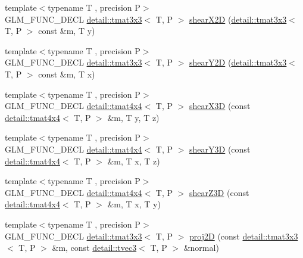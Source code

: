 \begin{DoxyCompactItemize}
\item 
{\footnotesize template$<$typename T , precision P$>$ }\\G\+L\+M\+\_\+\+F\+U\+N\+C\+\_\+\+D\+E\+CL \hyperlink{structglm_1_1detail_1_1tmat3x3}{detail\+::tmat3x3}$<$ T, P $>$ \hyperlink{group__gtx__transform2_gaa5a2d9216b3298b03252e549de6fd98a}{shear\+X2D} (\hyperlink{structglm_1_1detail_1_1tmat3x3}{detail\+::tmat3x3}$<$ T, P $>$ const \&m, T y)
\item 
{\footnotesize template$<$typename T , precision P$>$ }\\G\+L\+M\+\_\+\+F\+U\+N\+C\+\_\+\+D\+E\+CL \hyperlink{structglm_1_1detail_1_1tmat3x3}{detail\+::tmat3x3}$<$ T, P $>$ \hyperlink{group__gtx__transform2_ga1f5e68ada7a56cdf86c0c56d0b0a1832}{shear\+Y2D} (\hyperlink{structglm_1_1detail_1_1tmat3x3}{detail\+::tmat3x3}$<$ T, P $>$ const \&m, T x)
\item 
{\footnotesize template$<$typename T , precision P$>$ }\\G\+L\+M\+\_\+\+F\+U\+N\+C\+\_\+\+D\+E\+CL \hyperlink{structglm_1_1detail_1_1tmat4x4}{detail\+::tmat4x4}$<$ T, P $>$ \hyperlink{group__gtx__transform2_gaae5bbb490a3d798b083cbec0e0c2e94c}{shear\+X3D} (const \hyperlink{structglm_1_1detail_1_1tmat4x4}{detail\+::tmat4x4}$<$ T, P $>$ \&m, T y, T z)
\item 
{\footnotesize template$<$typename T , precision P$>$ }\\G\+L\+M\+\_\+\+F\+U\+N\+C\+\_\+\+D\+E\+CL \hyperlink{structglm_1_1detail_1_1tmat4x4}{detail\+::tmat4x4}$<$ T, P $>$ \hyperlink{group__gtx__transform2_ga4b5af90ecf76d312bb371f6111e1ae35}{shear\+Y3D} (const \hyperlink{structglm_1_1detail_1_1tmat4x4}{detail\+::tmat4x4}$<$ T, P $>$ \&m, T x, T z)
\item 
{\footnotesize template$<$typename T , precision P$>$ }\\G\+L\+M\+\_\+\+F\+U\+N\+C\+\_\+\+D\+E\+CL \hyperlink{structglm_1_1detail_1_1tmat4x4}{detail\+::tmat4x4}$<$ T, P $>$ \hyperlink{group__gtx__transform2_ga02fa747667daf42b64ea344d1076acee}{shear\+Z3D} (const \hyperlink{structglm_1_1detail_1_1tmat4x4}{detail\+::tmat4x4}$<$ T, P $>$ \&m, T x, T y)
\item 
{\footnotesize template$<$typename T , precision P$>$ }\\G\+L\+M\+\_\+\+F\+U\+N\+C\+\_\+\+D\+E\+CL \hyperlink{structglm_1_1detail_1_1tmat3x3}{detail\+::tmat3x3}$<$ T, P $>$ \hyperlink{group__gtx__transform2_gad51e1fa33875b966db2f97cb7f21c48a}{proj2D} (const \hyperlink{structglm_1_1detail_1_1tmat3x3}{detail\+::tmat3x3}$<$ T, P $>$ \&m, const \hyperlink{structglm_1_1detail_1_1tvec3}{detail\+::tvec3}$<$ T, P $>$ \&normal)

\end{DoxyCompactItemize}
